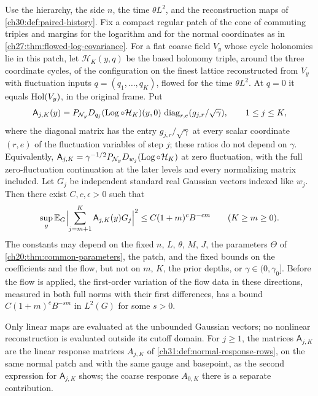 \begin{lemma}\label{ch30:lem:flat-gaussian-response-tail}
Use the hierarchy, the side $n$, the time $\theta L^2$, and the reconstruction maps of \cref{ch30:def:paired-history}. Fix a compact regular patch of the cone of commuting triples and margins for the logarithm and for the normal coordinates as in \cref{ch27:thm:flowed-log-covariance}. For a flat coarse field $V_y$ whose cycle holonomies lie in this patch, let $\mathcal H_K(y,q)$ be the based holonomy triple, around the three coordinate cycles, of the configuration on the finest lattice reconstructed from $V_y$ with fluctuation inputs $q=(q_1,\ldots,q_K)$, flowed for the time $\theta L^2$. At $q=0$ it equals $\operatorname{Hol}(V_y)$, in the original frame. Put
\[
 \mathsf A_{j,K}(y)=P_{\mathcal N_{y}}D_{q_j}(\operatorname{Log}\circ\mathcal H_K)(y,0)\,\operatorname{diag}_{r,e}(g_{j,r}/\sqrt\gamma),\qquad1\le j\le K,
\]
where the diagonal matrix has the entry $g_{j,r}/\sqrt\gamma$ at every scalar coordinate $(r,e)$ of the fluctuation variables of step $j$; these ratios do not depend on $\gamma$. Equivalently, $\mathsf A_{j,K}=\gamma^{-1/2}P_{\mathcal N_{y}}D_{w_j}(\operatorname{Log}\circ\mathcal H_K)$ at zero fluctuation, with the full zero-fluctuation continuation at the later levels and every normalizing matrix included. Let $G_j$ be independent standard real Gaussian vectors indexed like $w_j$. Then there exist $C,c,\epsilon>0$ such that
\[
 \sup_y\mathbb E_G\Bigl\lvert\sum_{j=m+1}^K\mathsf A_{j,K}(y)G_j\Bigr\rvert^2\le C(1+m)^cB^{-\epsilon m}\qquad(K\ge m\ge0).
\]
The constants may depend on the fixed $n$, $L$, $\theta$, $M$, $J$, the parameters $\Theta$ of \cref{ch20:thm:common-parameters}, the patch, and the fixed bounds on the coefficients and the flow, but not on $m$, $K$, the prior depths, or $\gamma\in(0,\gamma_0]$. Before the flow is applied, the first-order variation of the flow data in these directions, measured in both full norms with their first differences, has a bound $C(1+m)^cB^{-sm}$ in $L^2(G)$ for some $s>0$.
\end{lemma}

Only linear maps are evaluated at the unbounded Gaussian vectors; no nonlinear reconstruction is evaluated outside its cutoff domain. For $j\ge1$, the matrices $\mathsf A_{j,K}$ are the linear response matrices $A_{j,K}$ of \cref{ch31:def:normal-response-rows}, on the same normal patch and with the same gauge and basepoint, as the second expression for $\mathsf A_{j,K}$ shows; the coarse response $A_{0,K}$ there is a separate contribution.

